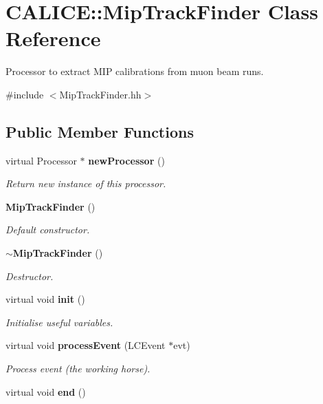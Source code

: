 \section{CALICE::MipTrackFinder Class Reference}
\label{classCALICE_1_1MipTrackFinder}


Processor to extract MIP calibrations from muon beam runs.  


{\ttfamily \#include $<$MipTrackFinder.hh$>$}\subsection*{Public Member Functions}
\begin{DoxyCompactItemize}
\item 
virtual Processor $\ast$ {\bf newProcessor} ()\label{classCALICE_1_1MipTrackFinder_a55a7f624a6bb8628c8e8516976593d71}

\begin{DoxyCompactList}\small\item\em Return new instance of this processor. \item\end{DoxyCompactList}\item 
{\bf MipTrackFinder} ()\label{classCALICE_1_1MipTrackFinder_a3806b8a42dbf92ec4ed61c1c8a8fbb94}

\begin{DoxyCompactList}\small\item\em Default constructor. \item\end{DoxyCompactList}\item 
{\bf $\sim$MipTrackFinder} ()\label{classCALICE_1_1MipTrackFinder_ae52b812fd15b89fd36954dcea97b4cf2}

\begin{DoxyCompactList}\small\item\em Destructor. \item\end{DoxyCompactList}\item 
virtual void {\bf init} ()\label{classCALICE_1_1MipTrackFinder_a99b9bed4ba17213c6b267bfbdc0ad9ce}

\begin{DoxyCompactList}\small\item\em Initialise useful variables. \item\end{DoxyCompactList}\item 
virtual void {\bf processEvent} (LCEvent $\ast$evt)
\begin{DoxyCompactList}\small\item\em Process event (the working horse). \item\end{DoxyCompactList}\item 
virtual void {\bf end} ()\label{classCALICE_1_1MipTrackFinder_ab580d34d2e630152123a1af2e24db24a}


\end{DoxyCompactItemize}
